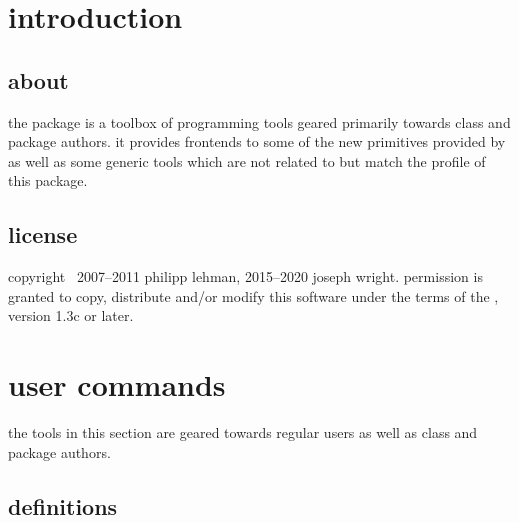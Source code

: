  
 

\printtitlepage
\tableofcontents

\section{introduction}
\label{int}

\subsection[about]{about }

the  package is a toolbox of programming tools geared primarily towards \latex class and package authors. it provides \latex frontends to some of the new primitives provided by \etex as well as some generic tools which are not related to \etex but match the profile of this package.

\subsection{license}

copyright \textcopyright\ 2007--2011 philipp lehman, 2015--2020 joseph wright. permission is granted to copy, distribute and\slash or modify this software under the terms of the \lppl, version 1.3c or later.

\section{user commands}
\label{use}

the tools in this section are geared towards regular users as well as class and package authors.

\subsection{definitions}
\label{use:def}

